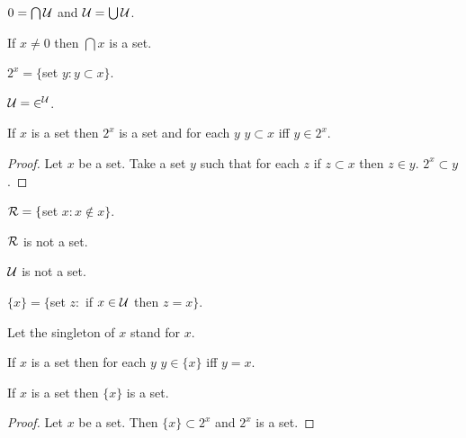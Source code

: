 \documentclass[a4paper,draft]{amsproc}
\begin{document}
\begin{forthel}
\begin{theorem}
$0 = \bigcap \cal{U}$ and $\cal{U} = \bigcup \cal{U}$.
\end{theorem}

\begin{theorem}
If $x \neq 0$ then $\bigcap x$ is a set.
\end{theorem}

\begin{definition} $2^{x} = \{$set $y : y \subset x\}$.\end{definition}

\begin{theorem}
$\cal{U} = 2^{\cal{U}}$.
\end{theorem}

\begin{theorem}
If $x$ is a set then $2^{x}$ is a set and for
each $y$  $y \subset x$ iff $y \in 2^{x}$.
\end{theorem}
\begin{proof}
Let $x$ be a set.
Take a set $y$ such that for each $z$ 
if $z \subset x$ then $z \in y$.
$2^{x} \subset y$.
\end{proof}

\begin{definition} $\cal{R} = \{$set $x : x \notin x\}$.\end{definition}

\begin{theorem}
$\cal{R}$ is not a set.
\end{theorem}

\begin{theorem}
$\cal{U}$ is not a set.
\end{theorem}

\begin{definition} $\{x\} = \{$set $z :$ if $x \in \cal{U}$ then $z = x\}$.\end{definition}
Let the singleton of $x$ stand for ${x}$.


\begin{theorem}
If $x$ is a set then for each $y$ $y \in \{x\}$ iff $y = x$.
\end{theorem}

\begin{theorem}
If $x$ is a set then $\{x\}$ is a set.
\end{theorem}
\begin{proof}
Let $x$ be a set. Then $\{x\} \subset 2^{x}$ 
and $2^{x}$ is a set.
\end{proof}


\end{forthel}
\end{document}
